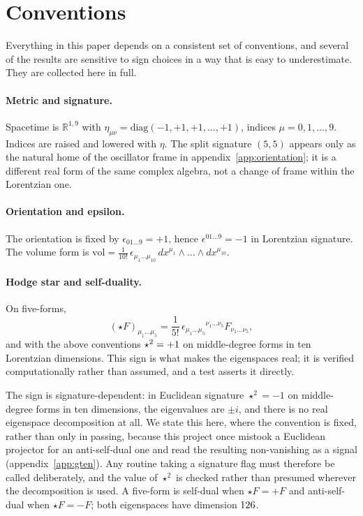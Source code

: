 \section{Conventions}
\label{app:conventions}

Everything in this paper depends on a consistent set of conventions, and several
of the results are sensitive to sign choices in a way that is easy to
underestimate. They are collected here in full.

\paragraph{Metric and signature.}
Spacetime is $\mathbb{R}^{1,9}$ with
$\eta_{\mu\nu} = \mathrm{diag}(-1,+1,+1,\dots,+1)$, indices
$\mu = 0,1,\dots,9$. Indices are raised and lowered with $\eta$. The split
signature $(5,5)$ appears only as the natural home of the oscillator frame in
appendix~\ref{app:orientation}; it is a different real form of the same complex
algebra, not a change of frame within the Lorentzian one.

\paragraph{Orientation and epsilon.}
The orientation is fixed by $\epsilon_{01\dots 9} = +1$, hence
$\epsilon^{01\dots 9} = -1$ in Lorentzian signature. The volume form is
$\mathrm{vol} = \tfrac{1}{10!}\,\epsilon_{\mu_1\dots\mu_{10}}\,
 dx^{\mu_1}\wedge\dots\wedge dx^{\mu_{10}}$.

\paragraph{Hodge star and self-duality.}
On five-forms,
\begin{equation}
(\star F)_{\mu_1\dots\mu_5}
 = \frac{1}{5!}\,\epsilon_{\mu_1\dots\mu_5}{}^{\nu_1\dots\nu_5}
   F_{\nu_1\dots\nu_5},
\end{equation}
and with the above conventions $\star^2 = +1$ on middle-degree forms
in ten Lorentzian dimensions. This sign is what makes the eigenspaces real; it is
verified computationally rather than assumed, and a test asserts it directly.

The sign is signature-dependent: in Euclidean signature $\star^2 = -1$ on
middle-degree forms in ten dimensions, the eigenvalues are $\pm i$, and there is
no real eigenspace decomposition at all. We state this here, where the convention
is fixed, rather than only in passing, because this project once mistook a
Euclidean projector for an anti-self-dual one and read the resulting
non-vanishing as a signal (appendix~\ref{app:gten}). Any routine taking a
signature flag must therefore be called deliberately, and the value of
$\star^2$ is checked rather than presumed wherever the decomposition is used.
A five-form is self-dual when $\star F = +F$ and anti-self-dual when
$\star F = -F$; both eigenspaces have dimension $126$.

